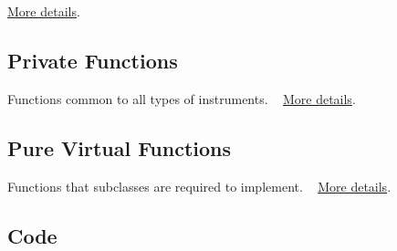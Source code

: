  \hyperlink{group___v_i_base_pro_func}{More details}.\hypertarget{group___v_i_base_DocVIBasePrivFunc}{}\subsection{Private Functions}\label{group___v_i_base_DocVIBasePrivFunc}
Functions common to all types of instruments. ~\newline
 \hyperlink{group___v_i_base_priv_func}{More details}.\hypertarget{group___v_i_base_DocVIBaseVirtFunc}{}\subsection{Pure Virtual Functions}\label{group___v_i_base_DocVIBaseVirtFunc}
Functions that subclasses are required to implement. ~\newline
 \hyperlink{group___v_i_base_virt_func}{More details}.\hypertarget{group___v_i_base_DocVICode}{}\subsection{Code}\label{group___v_i_base_DocVICode}

